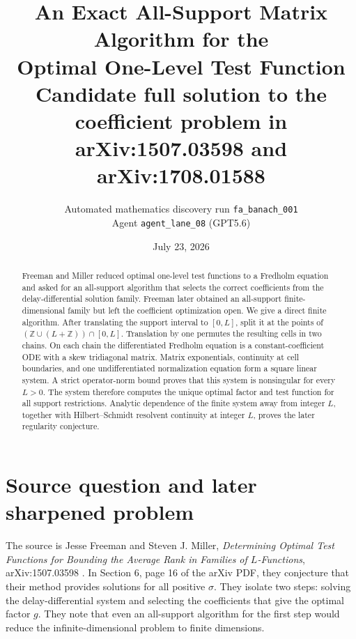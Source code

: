 \documentclass[11pt]{article}
\title{\textbf{An Exact All-Support Matrix Algorithm for the\\
Optimal One-Level Test Function}\\[4pt]
\large Candidate full solution to the coefficient problem in
arXiv:1507.03598 and arXiv:1708.01588}
\author{Automated mathematics discovery run \texttt{fa\_banach\_001}\\
Agent \texttt{agent\_lane\_08} (GPT5.6)}
\date{July 23, 2026}
\theoremstyle{definition}
\theoremstyle{remark}
\newcommand{\1}{\mathbf 1}
\begin{document}
\maketitle

\begin{center}
\end{center}

\begin{abstract}
Freeman and Miller reduced optimal one-level test functions to a Fredholm
equation and asked for an all-support algorithm that selects the correct
coefficients from the delay-differential solution family. Freeman later
obtained an all-support finite-dimensional family but left the coefficient
optimization open. We give a direct finite algorithm. After translating the
support interval to $[0,L]$, split it at the points of
$(\mathbb Z\cup(L+\mathbb Z))\cap[0,L]$. Translation by one permutes the
resulting cells in two chains. On each chain the differentiated Fredholm
equation is a constant-coefficient ODE with a skew tridiagonal matrix.
Matrix exponentials, continuity at cell boundaries, and one undifferentiated
normalization equation form a square linear system. A strict operator-norm
bound proves that this system is nonsingular for every $L>0$. The system
therefore computes the unique optimal factor and test function for all
support restrictions. Analytic dependence of the finite system away from
integer $L$, together with Hilbert--Schmidt resolvent continuity at integer
$L$, proves the later regularity conjecture.
\end{abstract}

\section{Source question and later sharpened problem}

The source is Jesse Freeman and Steven J. Miller,
\emph{Determining Optimal Test Functions for Bounding the Average Rank in
Families of $L$-Functions}, arXiv:1507.03598 \cite{FM2015}. In Section 6,
page 16 of the arXiv PDF, they conjecture that their method provides
solutions for all positive $\sigma$. They isolate two steps: solving the
delay-differential system and selecting the coefficients that give the
optimal factor $g$. They note that even an all-support algorithm for the
first step would reduce the infinite-dimensional problem to finite
dimensions.
\end{document}
